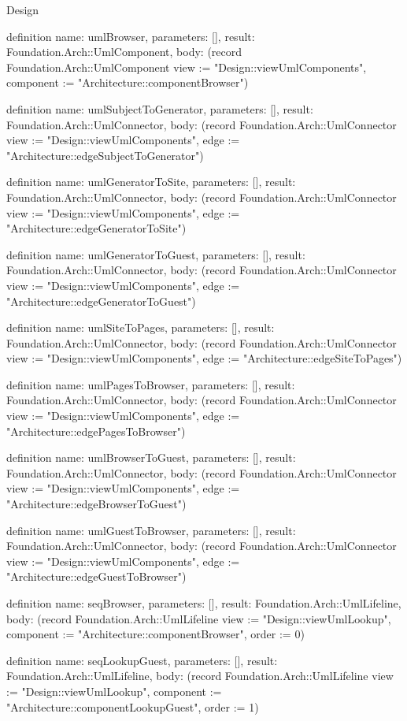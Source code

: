 \begin{lexlean}{Design}
\begin{semanticmodule}
definition{
  name: umlBrowser,
  parameters: [],
  result: Foundation.Arch::UmlComponent,
  body: (record Foundation.Arch::UmlComponent {view := "Design::viewUmlComponents", component := "Architecture::componentBrowser"})
}

definition{
  name: umlSubjectToGenerator,
  parameters: [],
  result: Foundation.Arch::UmlConnector,
  body: (record Foundation.Arch::UmlConnector {view := "Design::viewUmlComponents", edge := "Architecture::edgeSubjectToGenerator"})
}

definition{
  name: umlGeneratorToSite,
  parameters: [],
  result: Foundation.Arch::UmlConnector,
  body: (record Foundation.Arch::UmlConnector {view := "Design::viewUmlComponents", edge := "Architecture::edgeGeneratorToSite"})
}

definition{
  name: umlGeneratorToGuest,
  parameters: [],
  result: Foundation.Arch::UmlConnector,
  body: (record Foundation.Arch::UmlConnector {view := "Design::viewUmlComponents", edge := "Architecture::edgeGeneratorToGuest"})
}

definition{
  name: umlSiteToPages,
  parameters: [],
  result: Foundation.Arch::UmlConnector,
  body: (record Foundation.Arch::UmlConnector {view := "Design::viewUmlComponents", edge := "Architecture::edgeSiteToPages"})
}

definition{
  name: umlPagesToBrowser,
  parameters: [],
  result: Foundation.Arch::UmlConnector,
  body: (record Foundation.Arch::UmlConnector {view := "Design::viewUmlComponents", edge := "Architecture::edgePagesToBrowser"})
}

definition{
  name: umlBrowserToGuest,
  parameters: [],
  result: Foundation.Arch::UmlConnector,
  body: (record Foundation.Arch::UmlConnector {view := "Design::viewUmlComponents", edge := "Architecture::edgeBrowserToGuest"})
}

definition{
  name: umlGuestToBrowser,
  parameters: [],
  result: Foundation.Arch::UmlConnector,
  body: (record Foundation.Arch::UmlConnector {view := "Design::viewUmlComponents", edge := "Architecture::edgeGuestToBrowser"})
}

definition{
  name: seqBrowser,
  parameters: [],
  result: Foundation.Arch::UmlLifeline,
  body: (record Foundation.Arch::UmlLifeline {view := "Design::viewUmlLookup", component := "Architecture::componentBrowser", order := 0})
}

definition{
  name: seqLookupGuest,
  parameters: [],
  result: Foundation.Arch::UmlLifeline,
  body: (record Foundation.Arch::UmlLifeline {view := "Design::viewUmlLookup", component := "Architecture::componentLookupGuest", order := 1})
}


\end{semanticmodule}
\end{lexlean}
